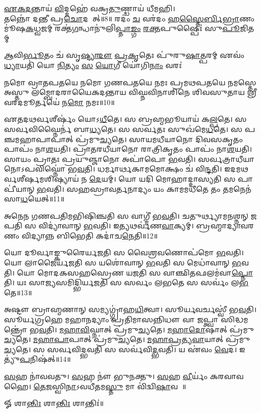 {\centering
\ul{𑌏}\ul{𑌕}\ul{𑌦}𑌨𑍍𑌤𑌾𑌯॑ \ul{𑌵𑌿}𑌦𑍍𑌮𑌹𑍇॑ 𑌵𑌕𑍍𑌰\ul{𑌤𑍁}𑌣𑍍𑌡𑌾𑌯॑ 𑌧𑍀𑌮𑌹𑌿।\\
  𑌤𑌨𑍍𑌨𑍋॑ 𑌦𑌨𑍍𑌤𑍀 𑌪𑍍𑌰\ul{𑌚𑍋}𑌦𑌯𑌾᳚𑌤𑍍॥8॥
{𑌰𑌦𑌂॑ \ul{𑌚} 𑌵𑌰॑𑌦𑌂 \ul{𑌹}\ul{𑌸𑍍𑌤𑍈}\ul{𑌰𑍍𑌬𑌿}\ul{𑌭𑍍𑌰𑌾}𑌣𑌂 𑌮𑍂॑𑌷\ul{𑌕}𑌧𑍍𑌵𑌜𑌮𑍍}
{𑌰𑌕𑍍𑌤॑\ul{𑌗}𑌨𑍍𑌧𑌾𑌨𑍁॑𑌲𑌿\ul{𑌪𑍍𑌤𑌾}\ul{𑌙𑍍𑌗𑌂} \ul{𑌰}\ul{𑌕𑍍𑌤}𑌪𑍁𑌷𑍍𑌪𑍈𑌃॑ 𑌸𑍁\ul{𑌪𑍂}𑌜𑌿𑌤𑌮𑍍}
\addtocounter{shlokacount}{8}
{\ul{𑌆}𑌵𑌿\ul{𑌰𑍍𑌭𑍂}𑌤𑌂 𑌚॑ 𑌸𑍃\ul{𑌷𑍍𑌟𑍍𑌯𑌾}\ul{𑌦𑍗} \ul{𑌪𑍍𑌰}\ul{𑌕𑍃}𑌤𑍇𑌃 𑌪𑍁॑𑌰𑍁\ul{𑌷𑌾}𑌤𑍍𑌪𑌰𑌮𑍍}
{𑌏𑌵𑌂॑ \ul{𑌧𑍍𑌯𑌾}𑌯𑌤𑌿॑ 𑌯𑍋 \ul{𑌨𑌿}\ul{𑌤𑍍𑌯𑌂} \ul{𑌸} \ul{𑌯𑍋}𑌗𑍀 𑌯𑍋॑𑌗𑌿\ul{𑌨𑌾𑌂} 𑌵𑌰𑌃॑}
}

𑌨𑌮𑍋 𑌵𑍍𑌰𑌾𑌤𑌪𑌤𑌯𑍇 𑌨𑌮𑍋 𑌗𑌣𑌪𑌤𑌯𑍇 𑌨𑌮𑌃 𑌪𑍍𑌰𑌮𑌥𑌪𑌤𑌯𑍇 𑌨𑌮𑌸𑍍𑌤𑍇 𑌅𑌸𑍍𑌤𑍁 𑌲𑌮𑍍𑌬𑍋𑌦𑌰𑌾𑌯𑍈𑌕𑌦𑌨𑍍𑌤𑌾𑌯 𑌵𑌿𑌘𑍍𑌨𑌵𑌿𑌨𑌾𑌶𑌿𑌨𑍇 𑌶𑌿𑌵𑌸𑍁𑌤𑌾𑌯 𑌶𑍍𑌰𑍀𑌵𑌰𑌦𑌮𑍂‍𑌰𑍍𑌤𑌯𑍇॑ 𑌨\ul{𑌮𑍋} 𑌨𑌮𑌃॥10॥

𑌏𑌤𑌦𑌥𑌰𑍍𑌵𑌶𑍀𑌰𑍍𑌷𑌂॑ 𑌯𑍋𑌽\ul{𑌧𑍀}𑌤𑍇। 𑌸 𑌬𑍍𑌰𑌹𑍍𑌮𑌭𑍂𑌯𑌾𑌯॑ 𑌕\ul{𑌲𑍍𑌪}𑌤𑍇।  𑌸 𑌸𑌰𑍍𑌵𑌵𑌿𑌘𑍍𑌨𑍈𑌰𑍍𑌨॑ 𑌬𑌾\ul{𑌧𑍍𑌯}𑌤𑍇।
𑌸 𑌸𑌰𑍍𑌵𑌤𑌃 𑌸𑍁𑌖॑𑌮𑍇\ul{𑌧}𑌤𑍇।  𑌸 𑌪𑌞𑍍𑌚𑌮𑌹𑌾𑌪𑌾𑌪𑌾𑌤𑍍 𑌪𑍍𑌰॑𑌮𑍁\ul{𑌚𑍍𑌯}𑌤𑍇।
𑌸𑌾𑌯𑌮𑌧𑍀𑌯𑌾𑌨𑍋 𑌦𑌿𑌵𑌸𑌕𑍃𑌤𑌂 𑌪𑌾𑌪𑌂॑ 𑌨𑌾\ul{𑌶}𑌯𑌤𑌿।  𑌪𑍍𑌰𑌾𑌤𑌰𑌧𑍀𑌯𑌾𑌨𑍋 𑌰𑌾𑌤𑍍𑌰𑌿𑌕𑍃𑌤𑌂 𑌪𑌾𑌪𑌂॑ 𑌨𑌾\ul{𑌶}𑌯𑌤𑌿।
𑌸𑌾𑌯𑌂 𑌪𑍍𑌰𑌾𑌤𑌃 𑌪𑍍𑌰𑌯𑍁𑌞𑍍𑌜𑌾𑌨𑍋 𑌅𑌪𑌾॑𑌪𑍋 \ul{𑌭}𑌵𑌤𑌿।  𑌸𑌰𑍍𑌵𑌤𑍍𑌰𑌾𑌧𑍀𑌯𑌾𑌨𑍋𑌽𑌪𑌵𑌿𑌘𑍍𑌨𑍋॑ 𑌭\ul{𑌵}𑌤𑌿।
𑌧𑌰𑍍𑌮𑌾𑌰𑍍𑌥𑌕𑌾𑌮𑌮𑍋𑌕𑍍𑌷𑌂 𑌚॑ 𑌵𑌿\ul{𑌨𑍍𑌦}𑌤𑌿। 𑌇𑌦𑌮𑌥𑌰𑍍𑌵𑌶𑍀𑌰𑍍𑌷𑌮𑌶𑌿𑌷𑍍𑌯𑌾𑌯॑ 𑌨 \ul{𑌦𑍇}𑌯𑌮𑍍।  𑌯𑍋 𑌯𑌦𑌿 𑌮𑍋𑌹𑌾𑌦𑍍𑌦𑌾𑌸𑍍𑌯𑌤𑌿 𑌸 𑌪𑌾𑌪𑍀॑𑌯𑌾𑌨𑍍 \ul{𑌭}𑌵𑌤𑌿।
𑌸𑌹𑌸𑍍𑌰𑌾𑌵𑌰𑍍𑌤𑌨𑌾𑌦𑍍𑌯𑌂 𑌯𑌂 𑌕𑌾𑌮𑌮𑌧𑍀𑌤𑍇 𑌤𑌂 𑌤𑌮𑌨𑍇𑌨॑ 𑌸𑌾\ul{𑌧}𑌯𑍇𑌤𑍍॥11॥

𑌅𑌨𑍇𑌨 𑌗𑌣𑌪𑌤𑌿𑌮𑌭𑌿𑌷𑌿𑌞𑍍𑌚𑌤𑌿 𑌸 𑌵𑌾𑌗𑍍𑌮𑍀॑ 𑌭\ul{𑌵}𑌤𑌿।  𑌚𑌤𑍁𑌰𑍍𑌥𑍍𑌯𑌾𑌮𑌨𑌶𑍍𑌨𑌨𑍍 𑌜𑌪𑌤𑌿 𑌸 𑌵𑌿𑌦𑍍𑌯𑌾॑𑌵𑌾𑌨𑍍 \ul{𑌭}𑌵𑌤𑌿।  𑌇𑌤𑍍𑌯𑌥𑌰𑍍𑌵॑𑌣\ul{𑌵𑌾}𑌕𑍍𑌯𑌮𑍍। 𑌬𑍍𑌰𑌹𑍍𑌮𑌾𑌦𑍍𑌯𑌾𑌵𑌰𑌣𑌂 𑌵𑌿𑌦𑍍𑌯𑌾𑌨𑍍𑌨 𑌬𑌿𑌭𑍇𑌤𑌿 𑌕𑌦𑌾॑𑌚\ul{𑌨𑍇}𑌤𑌿॥12॥

𑌯𑍋 𑌦𑍂𑌰𑍍𑌵𑌾𑌙𑍍𑌕𑍁𑌰𑍈𑌰𑍍𑌯𑌜𑌤𑌿 𑌸 𑌵𑍈𑌶𑍍𑌰𑌵𑌣𑍋𑌪॑𑌮𑍋 \ul{𑌭}𑌵𑌤𑌿। 𑌯𑍋 𑌲𑌾𑌜𑍈𑌰𑍍𑌯𑌜𑌤𑌿 𑌸 𑌯𑌶𑍋॑𑌵𑌾𑌨𑍍 \ul{𑌭}𑌵𑌤𑌿 𑌸 𑌮𑍇𑌧𑌾॑𑌵𑌾𑌨𑍍 \ul{𑌭}𑌵𑌤𑌿। 
𑌯𑍋 𑌮𑍋𑌦𑌕𑌸𑌹𑌸𑍍𑌰𑍇𑌣 𑌯𑌜𑌤𑌿 𑌸 𑌵𑌾𑌞𑍍𑌛𑌿𑌤𑌫𑌲𑌮॑𑌵𑌾\ul{𑌪𑍍𑌨𑍋}𑌤𑌿। 𑌯𑌃 𑌸𑌾𑌜𑍍𑌯𑌸𑌮𑌿𑌦𑍍𑌭𑌿𑌰𑍍𑌯𑌜𑌤𑌿 𑌸 𑌸𑌰𑍍𑌵𑌂 𑌲𑌭𑌤𑍇 𑌸 𑌸𑌰𑍍𑌵𑌂॑ 𑌲\ul{𑌭}𑌤𑍇॥13॥

𑌅𑌷𑍍𑌟𑍗 𑌬𑍍𑌰𑌾𑌹𑍍𑌮𑌣𑌾𑌨𑍍 𑌸𑌮𑍍𑌯𑌗𑍍𑌗𑍍𑌰𑌾॑𑌹\ul{𑌯𑌿}𑌤𑍍𑌵𑌾। 𑌸𑍂𑌰𑍍𑌯𑌵𑌰𑍍𑌚𑌸𑍍𑌵𑍀॑ 𑌭\ul{𑌵}𑌤𑌿।
𑌸𑍂𑌰𑍍𑌯𑌗𑍍𑌰𑌹𑍇 𑌮𑌹𑌾𑌨𑌦𑍍𑌯𑌾𑌂 𑌪𑍍𑌰𑌤𑌿𑌮𑌾𑌸𑌨𑍍𑌨𑌿𑌧𑍗 𑌵𑌾 𑌜𑌪𑍍𑌤𑍍𑌵𑌾 𑌸𑌿𑌦𑍍𑌧𑌮𑌨𑍍𑌤𑍍𑌰𑍋॑ 𑌭\ul{𑌵}𑌤𑌿।
\ul{𑌮}\ul{𑌹𑌾}\ul{𑌵𑌿}𑌘𑍍𑌨𑌾𑌤𑍍 𑌪𑍍𑌰॑𑌮𑍁\ul{𑌚𑍍𑌯}𑌤𑍇।  \ul{𑌮}\ul{𑌹𑌾}\ul{𑌦𑍋}𑌷𑌾𑌤𑍍 𑌪𑍍𑌰॑𑌮𑍁\ul{𑌚𑍍𑌯}𑌤𑍇। \ul{𑌮}\ul{𑌹𑌾}\ul{𑌪𑌾}𑌪𑌾𑌤𑍍 𑌪𑍍𑌰॑𑌮𑍁\ul{𑌚𑍍𑌯}𑌤𑍇।
\ul{𑌮}\ul{𑌹𑌾}\ul{𑌪𑍍𑌰}\ul{𑌤𑍍𑌯}\ul{𑌵𑌾}𑌯𑌾𑌤𑍍 𑌪𑍍𑌰॑𑌮𑍁\ul{𑌚𑍍𑌯}𑌤𑍇। 𑌸 𑌸𑌰𑍍𑌵𑌵𑌿𑌦𑍍𑌭𑌵𑌤𑌿 𑌸 𑌸𑌰𑍍𑌵॑𑌵𑌿\ul{𑌦𑍍𑌭}𑌵𑌤𑌿। 𑌯 𑌏॑𑌵𑌂 \ul{𑌵𑍇}𑌦।  𑌇𑌤𑍍𑌯𑍁॑\ul{𑌪}𑌨𑌿𑌷॑𑌤𑍍॥14॥

\ul{𑌸}𑌹 𑌨𑌾॑𑌵𑌵𑌤𑍁। \ul{𑌸}𑌹 𑌨𑍗॑ 𑌭𑍁𑌨𑌕𑍍𑌤𑍁। \ul{𑌸}𑌹 \ul{𑌵𑍀}𑌰𑍍𑌯𑌂॑ 𑌕𑌰𑌵𑌾𑌵𑌹𑍈।
\ul{𑌤𑍇}\ul{𑌜}𑌸𑍍𑌵𑌿\ul{𑌨𑌾}𑌽𑌵𑌧𑍀॑𑌤𑌮\ul{𑌸𑍍𑌤𑍁} 𑌮𑌾 𑌵𑌿॑𑌦𑍍𑌵𑌿\ul{𑌷𑌾}𑌵𑌹𑍈᳚॥

\centerline{𑍐 𑌶𑌾\ul{𑌨𑍍𑌤𑌿𑌃} 𑌶𑌾\ul{𑌨𑍍𑌤𑌿𑌃} 𑌶𑌾𑌨𑍍𑌤𑌿𑌃॑॥}
